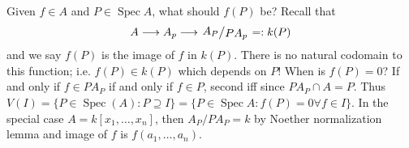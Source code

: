 \documentclass[11pt, a4paper]{memoir}
\newcommand{\lto}[0]{\ensuremath{\longrightarrow}}
\theoremstyle{change}
\theoremstyle{plain}
\theoremstyle{nonumberplain}
\DeclareMathOperator{\Spec}{Spec}
\newcommand{\quot}[2]{\mathchoice{\left.\raisebox{0.10em}{$#1$}\middle/\raisebox{-0.10em}{$#2$}\right.}
                                 {\left.\raisebox{0.04em}{$#1$}\middle/\raisebox{-0.04em}{$#2$}\right.}
                                 {\left.\raisebox{0.01em}{$#1$}\middle/\raisebox{-0.01em}{$#2$}\right.}
                                 {\left.\raisebox{0em}{$#1$}\middle/\raisebox{0em}{$#2$}\right.}}
\numberwithin{equation}{section}
\begin{document}
Given $f\in A$ and $P\in\Spec A$, what should $f(P)$ be?
Recall that
\begin{equation*}
    A\lto A_p\lto \quot{A_P}{PA_p}=:k(P)
\end{equation*}
and we say $f(P)$ is the image of $f$ in $k(P)$.
There is no natural codomain to this function; i.e. $f(P)\in k(P)$ which depends on $P$!
When is $f(P)=0$?
If and only if $f\in PA_P$ if and only if $f\in P$, second iff since $PA_P\cap A=P$.
Thus $V(I)=\{P\in\Spec(A):P\supseteq I\}=\{P\in\Spec A:f(P)=0\forall f\in I\}$.
In the special case $A=k[x_1,\ldots,x_n]$, then $A_P/PA_P=k$ by Noether normalization lemma and image of $f$ is $f(a_1,\ldots,a_n)$.
\end{document}
